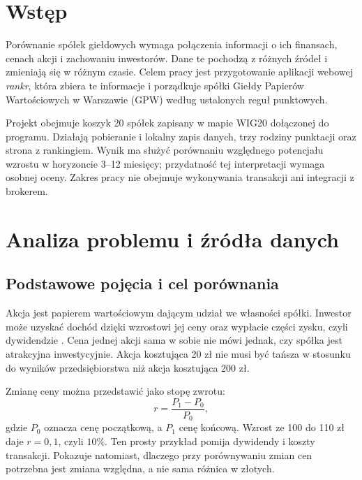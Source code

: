 \documentclass[12pt,a4paper,twoside]{report}
\begin{document}
\hypersetup{pageanchor=true}
\renewcommand{\contentsname}{\LARGE Spis treści}
\setcounter{tocdepth}{1}
\tableofcontents
\cleardoublepage

\chapter*{Wstęp}

Porównanie spółek giełdowych wymaga połączenia informacji o ich finansach, cenach akcji i zachowaniu inwestorów. Dane te pochodzą z różnych źródeł i zmieniają się w różnym czasie. Celem pracy jest przygotowanie aplikacji webowej \textit{rankr}, która zbiera te informacje i porządkuje spółki Giełdy Papierów Wartościowych w Warszawie (GPW) według ustalonych reguł punktowych.

Projekt obejmuje koszyk 20 spółek zapisany w mapie WIG20 dołączonej do programu. Działają pobieranie i lokalny zapis danych, trzy rodziny punktacji oraz strona z rankingiem. Wynik ma służyć porównaniu względnego potencjału wzrostu w horyzoncie 3--12 miesięcy; przydatność tej interpretacji wymaga osobnej oceny. Zakres pracy nie obejmuje wykonywania transakcji ani integracji z brokerem.


\cleardoublepage
\chapter{Analiza problemu i źródła danych}
\label{chap:data}

\section{Podstawowe pojęcia i cel porównania}

Akcja jest papierem wartościowym dającym udział we własności spółki. Inwestor może uzyskać dochód dzięki wzrostowi jej ceny oraz wypłacie części zysku, czyli dywidendzie \cite{stocks}. Cena jednej akcji sama w sobie nie mówi jednak, czy spółka jest atrakcyjna inwestycyjnie. Akcja kosztująca 20 zł nie musi być tańsza w stosunku do wyników przedsiębiorstwa niż akcja kosztująca 200 zł.

Zmianę ceny można przedstawić jako stopę zwrotu:
\begin{equation}
    r=\frac{P_1-P_0}{P_0},
\end{equation}
gdzie $P_0$ oznacza cenę początkową, a $P_1$ cenę końcową. Wzrost ze 100 do 110 zł daje $r=0{,}1$, czyli $10\%$. Ten prosty przykład pomija dywidendy i koszty transakcji. Pokazuje natomiast, dlaczego przy porównywaniu zmian cen potrzebna jest zmiana względna, a nie sama różnica w złotych.
\end{document}
